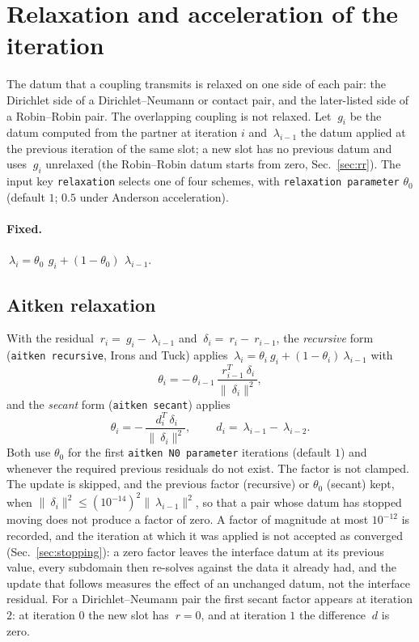 \documentclass[11pt]{article}
\newcommand{\norm}[1]{\lVert #1 \rVert}
\newcommand{\code}[1]{\texttt{#1}}
\begin{document}
\section{Relaxation and acceleration of the iteration}
\label{sec:relaxation}

The datum that a coupling transmits is relaxed on one side of each pair:
the Dirichlet side of a Dirichlet--Neumann or contact pair, and the
later-listed side of a Robin--Robin pair. The overlapping coupling is not
relaxed. Let $~g_i$ be the datum computed from the partner at iteration
$i$ and $~\lambda_{i-1}$ the datum applied at the previous iteration of
the same slot; a new slot has no previous datum and uses $~g_i$
unrelaxed (the Robin--Robin datum starts from zero, Sec.~\ref{sec:rr}).
The input key \code{relaxation} selects one of four schemes, with
\code{relaxation parameter} $\theta_0$ (default $1$; $0.5$ under
Anderson acceleration).

\paragraph{Fixed.} $~\lambda_i = \theta_0\, ~g_i + (1 - \theta_0)\, ~\lambda_{i-1}$.

\subsection{Aitken relaxation}
\label{sec:aitken}

With the residual $~r_i = ~g_i - ~\lambda_{i-1}$ and
$~\delta_i = ~r_i - ~r_{i-1}$, the \emph{recursive} form
(\code{aitken recursive}, Irons and Tuck) applies
$~\lambda_i = \theta_i ~g_i + (1 - \theta_i) ~\lambda_{i-1}$ with
\begin{equation}
  \theta_i = -\,\theta_{i-1}\, \frac{~r_{i-1}^T ~\delta_i}{\norm{~\delta_i}^2},
  \label{eq:aitken-recursive}
\end{equation}
and the \emph{secant} form (\code{aitken secant}) applies
\begin{equation}
  \theta_i = -\,\frac{~d_i^T ~\delta_i}{\norm{~\delta_i}^2}, \qquad
  ~d_i = ~\lambda_{i-1} - ~\lambda_{i-2}.
  \label{eq:aitken-secant}
\end{equation}
Both use $\theta_0$ for the first \code{aitken N0 parameter} iterations
(default $1$) and whenever the required previous residuals do not exist.
The factor is not clamped. The update is skipped, and the previous factor
(recursive) or $\theta_0$ (secant) kept, when
$\norm{~\delta_i}^2 \le (10^{-14})^2 \norm{~\lambda_{i-1}}^2$, so that a
pair whose datum has stopped moving does not produce a factor of zero. A
factor of magnitude at most $10^{-12}$ is recorded, and the iteration at
which it was applied is not accepted as converged
(Sec.~\ref{sec:stopping}): a zero factor leaves the interface datum at
its previous value, every subdomain then re-solves against the data it
already had, and the update that follows measures the
effect of an unchanged datum, not the interface residual. For a Dirichlet--Neumann pair the first secant factor
appears at iteration $2$: at iteration $0$ the new slot has $~r = 0$,
and at iteration $1$ the difference $~d$ is zero.
\end{document}

